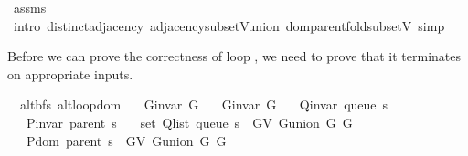 \begin{isabellebody}
\isamarkupfalse%
\ assms\isanewline
\ \ \isamarkupfalse%
\ {\isacharparenleft}{\kern0pt}intro\ distinct{\isacharunderscore}{\kern0pt}adjacency\ adjacency{\isacharunderscore}{\kern0pt}subset{\isacharunderscore}{\kern0pt}V{\isacharunderscore}{\kern0pt}union\ dom{\isacharunderscore}{\kern0pt}parent{\isacharunderscore}{\kern0pt}fold{\isacharunderscore}{\kern0pt}subset{\isacharunderscore}{\kern0pt}V{\isacharparenright}{\kern0pt}\ simp{\isacharplus}{\kern0pt}%
\endisatagproof
{\isafoldproof}%
%
\isadelimproof
%
\endisadelimproof
%
\isadelimdocument
%
\endisadelimdocument
%
\isatagdocument
%
\isamarkuptrue%
%
\endisatagdocument
{\isafolddocument}%
%
\isadelimdocument
%
\endisadelimdocument
%
\begin{isamarkuptext}%
Before we can prove the correctness of loop , we need to prove that it
terminates on appropriate inputs.%
\end{isamarkuptext}\isamarkuptrue%
\isamarkupfalse%
\ {\isacharparenleft}{\kern0pt}\ alt{\isacharunderscore}{\kern0pt}bfs{\isacharparenright}{\kern0pt}\ alt{\isacharunderscore}{\kern0pt}loop{\isacharunderscore}{\kern0pt}dom{\isacharcolon}{\kern0pt}\isanewline
\ \ \ {\isachardoublequoteopen}G{\isachardot}{\kern0pt}invar\ G{}{\isachardoublequoteclose}\isanewline
\ \ \ {\isachardoublequoteopen}G{\isachardot}{\kern0pt}invar\ G{}{\isachardoublequoteclose}\isanewline
\ \ \ {\isachardoublequoteopen}Q{\isacharunderscore}{\kern0pt}invar\ {\isacharparenleft}{\kern0pt}queue\ s{\isacharparenright}{\kern0pt}{\isachardoublequoteclose}\isanewline
\ \ \ {\isachardoublequoteopen}P{\isacharunderscore}{\kern0pt}invar\ {\isacharparenleft}{\kern0pt}parent\ s{\isacharparenright}{\kern0pt}{\isachardoublequoteclose}\isanewline
\ \ \ {\isachardoublequoteopen}set\ {\isacharparenleft}{\kern0pt}Q{\isacharunderscore}{\kern0pt}list\ {\isacharparenleft}{\kern0pt}queue\ s{\isacharparenright}{\kern0pt}{\isacharparenright}{\kern0pt}\ {\isasymsubseteq}\ G{\isachardot}{\kern0pt}V\ {\isacharparenleft}{\kern0pt}G{\isachardot}{\kern0pt}union\ G{}\ G{}{\isacharparenright}{\kern0pt}{\isachardoublequoteclose}\isanewline
\ \ \ {\isachardoublequoteopen}P{\isachardot}{\kern0pt}dom\ {\isacharparenleft}{\kern0pt}parent\ s{\isacharparenright}{\kern0pt}\ {\isasymsubseteq}\ G{\isachardot}{\kern0pt}V\ {\isacharparenleft}{\kern0pt}G{\isachardot}{\kern0pt}union\ G{}\ G{}{\isacharparenright}{\kern0pt}{\isachardoublequoteclose}\isanewline

\end{isabellebody}
